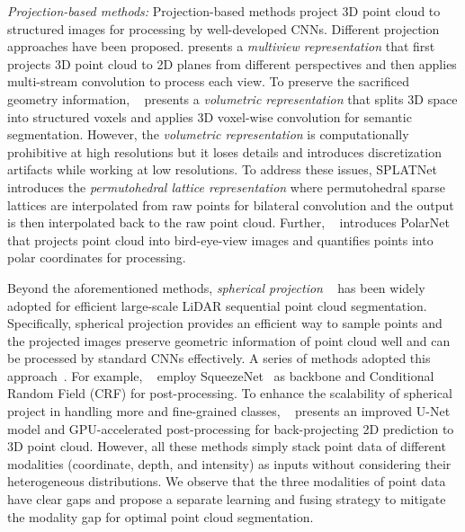 \documentclass[preprint,review,3p]{elsarticle}
\begin{document}
\textit{Projection-based methods:} 
Projection-based methods project 3D point cloud to structured images for processing by well-developed CNNs. Different projection approaches have been proposed. \cite{lawin2017deep} presents a \textit{multiview representation} that first projects 3D point cloud to 2D planes from different perspectives and then applies multi-stream convolution to process each view. To preserve the sacrificed geometry information, ~\cite{huang2016point,tchapmi2017segcloud,meng2019vv} presents a \textit{volumetric representation} that splits 3D space into structured voxels and applies 3D voxel-wise convolution for semantic segmentation. However, the \textit{volumetric representation} is computationally prohibitive at high resolutions but it loses details and introduces discretization artifacts while working at low resolutions. To address these issues, SPLATNet~\cite{su2018splatnet} introduces the \textit{permutohedral lattice representation} where permutohedral sparse lattices are interpolated from raw points for bilateral convolution and the output is then interpolated back to the raw point cloud. Further, ~\cite{zhang2020polarnet} introduces PolarNet that projects point cloud into bird-eye-view images and quantifies points into polar coordinates for processing.

Beyond the aforementioned methods, \textit{spherical projection} ~\cite{wu2018squeezeseg} has been widely adopted for efficient large-scale LiDAR sequential point cloud segmentation. Specifically, spherical projection provides an efficient way to sample points and the projected images preserve geometric information of point cloud well and can be processed by standard CNNs effectively. A series of methods adopted this approach~\cite{wang2018pointseg, wu2018squeezeseg, wu2019squeezesegv2, milioto2019rangenet++, xu2020squeezesegv3,cortinhal2020salsanext,alonso20203d}. For example, ~\cite{wu2018squeezeseg,wang2018pointseg,wu2019squeezesegv2} employ SqueezeNet~\cite{iandola2016squeezenet} as backbone and Conditional Random Field (CRF) for post-processing. To enhance the scalability of spherical project in handling more and fine-grained classes, ~\cite{milioto2019rangenet++} presents an improved U-Net model \cite{ronneberger2015u} and GPU-accelerated post-processing for back-projecting 2D prediction to 3D point cloud. However, all these methods simply stack point data of different modalities (coordinate, depth, and intensity) as inputs without considering their heterogeneous distributions. We observe that the three modalities of point data have clear gaps and propose a separate learning and fusing strategy to mitigate the modality gap for optimal point cloud segmentation.
\end{document}
